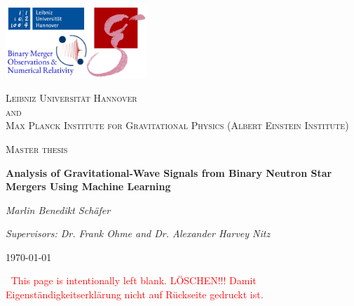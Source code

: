 \documentclass[11pt,a4paper]{article}
\numberwithin{equation}{section}
\theoremstyle{mystyle}
\numberwithin{thm}{subsection}
\begin{document}
\begin{titlepage}
\raggedbottom
\raggedright
\includegraphics[width=0.4\textwidth]{Logo.png}\par
\vspace{0.7cm}
\centering
{\scshape\LARGE Leibniz Universität Hannover\\and\\Max Planck Institute for Gravitational Physics (Albert Einstein Institute)\par}
\vspace{1cm}
{\scshape\Large Master thesis\par}
\vspace{1.2cm}
{\bfseries\huge Analysis of Gravitational-Wave Signals from Binary Neutron Star Mergers Using Machine Learning\par}
\vspace{2cm}
{\itshape\Large Marlin Benedikt Schäfer\par}
\vfill
{\itshape Supervisors: Dr. Frank Ohme and Dr. Alexander Harvey Nitz\par}
\vfill
{\large\today\par}
\vfill
\end{titlepage}
\thispagestyle{empty}
\newpage

\setcounter{page}{2}
$\ $
\textcolor{red}{This page is intentionally left blank. LÖSCHEN!!! Damit Eigenständigkeitserklärung nicht auf Rückseite gedruckt ist.}
\thispagestyle{empty}
\newpage
\end{document}
